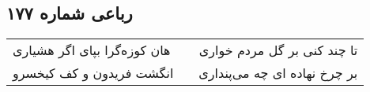 \begin{center}
\section*{رباعی شماره ۱۷۷}
\label{sec:sh177}
\begin{longtable}{l p{0.5cm} r}
هان کوزه‌گرا بپای اگر هشیاری
&&
تا چند کنی بر گل مردم خواری
\\
انگشت فریدون و کف کیخسرو
&&
بر چرخ نهاده ای چه می‌پنداری
\\
\end{longtable}
\end{center}
